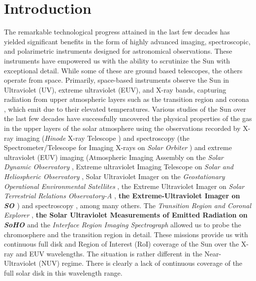 \justifying

\section{Introduction} \label{sec:intro}

The remarkable technological progress attained in the last few decades has yielded significant benefits in the form of highly advanced imaging, spectroscopic, and polarimetric instruments designed for astronomical observations. These instruments have empowered us with the ability to scrutinize the Sun with exceptional detail. While some of these are ground based telescopes, the others operate from space. Primarily, space-based instruments observe the Sun in Ultraviolet (UV), extreme ultraviolet (EUV), and X-ray bands, capturing radiation from upper atmospheric layers such as the transition region and corona
, which emit due to their elevated temperatures. Various studies of the Sun over the last few decades have successfully uncovered the physical properties of the gas in the upper layers of the solar atmosphere using the observations recorded by X-ray imaging ({\it Hinode} X-ray Telescope \citep[{\it Hindoe}/XRT,][]{xrt}) and spectroscopy (the Spectrometer/Telescope for Imaging X-rays on {\it Solar Orbiter} \citep[{\it SO}/STIX,][]{stix}) and extreme ultraviolet (EUV) imaging (Atmospheric Imaging Assembly on the {\it Solar Dynamic Observatory} \cite[{\it SDO}/AIA,][]{aia}, Extreme ultraviolet Imaging Telescope on {\it Solar and Heliospheric Observatory} \cite[{\it SoHO}/EIT,][]{eit}, Solar Ultraviolet Imager on the {\it Geostationary Operational Environmental Satellites} \citep[{\it GOES}/SUVI,][]{suvi}, the Extreme Ultraviolet Imager on {\it Solar Terrestrial Relations Observatory-A} \cite[{\it STEREO-A}/EUVI,][]{stereo,euvi}, \textbf{the Extreme-Ultraviolet Imager on {\it SO} \citep[{\it SO}/EUI][]{eui}}) and spectroscopy \citep[Hinode/EIS,][]{eis}, among many others. The {\it Transition Region and Coronal Explorer} \citep[{\it TRACE},][]{trace}, \textbf{the Solar Ultraviolet Measurements of Emitted Radiation on {\it SoHO} \citep[{\it SoHO}/SUMER,][]{sumer}} and the {\it Interface Region Imaging Spectrograph} \citep[~{\it IRIS},][]{iris} allowed us to probe the chromosphere and the transition region in detail. These missions provide us with continuous full disk and Region of Interest (RoI) coverage of the Sun over the X-ray and EUV wavelengths. The situation is rather different in the Near-Ultraviolet (NUV) regime. There is clearly a lack of continuous coverage of the full solar disk in this wavelength range. 

